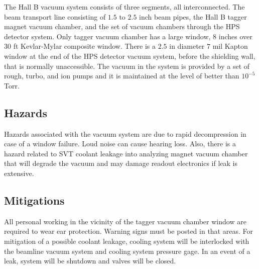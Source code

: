 

The Hall B vacuum system consists of three segments, all interconnected. The beam transport line consisting of $1.5$ to $2.5$ inch beam pipes, the Hall B tagger magnet vacuum chamber, and the set of vacuum chambers through the HPS detector system. Only tagger vacuum chamber has a large window, $8$ inches over $30$ ft Kevlar-Mylar composite window. There is a $2.5$ in diameter $7$ mil Kapton window at the end of the HPS detector vacuum system, before the shielding wall, that is normally unaccessible. The vacuum in the system is provided by a set of rough, turbo, and ion pumps and it is maintained at the level of better than $10^{-5}$ Torr. 

\subsection{Hazards} 

\indent

Hazards associated with the vacuum system are due to rapid decompression in case of a window failure. Loud noise can cause hearing loss. Also, there is a hazard related to SVT coolant leakage into analyzing magnet vacuum chamber that will degrade the vacuum and may damage readout electronics if leak is extensive.

\subsection{Mitigations}

\indent

All personal working in the vicinity of the tagger vacuum chamber window are required to wear ear protection. Warning signs must be posted in that areas. For mitigation of a possible coolant leakage, cooling system will be interlocked with the beamline vacuum system and cooling system pressure gage. In an event of a leak, system will be shutdown and valves will be closed. 

